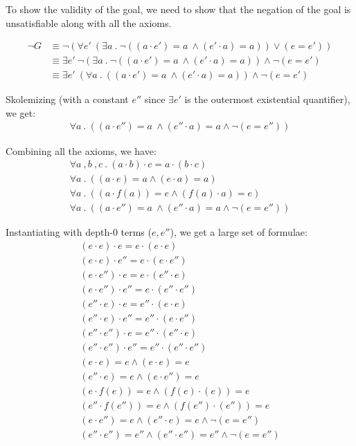 \documentclass[12pt,letterpaper, onecolumn]{exam}
\begin{document}
\begin{questions}
	To show the validity of the goal, we need to show that the negation of the goal is unsatisfiable along with all the axioms.

	\begin{align*}
		\neg G &\equiv \neg (\forall e' \: (\exists a \:.\: \neg((a \cdot e') = a \: \land (e' \cdot a) = a)) \lor (e = e')) \\
		&\equiv \exists e' \: \neg (\exists a \:.\: \neg((a \cdot e') = a \: \land (e' \cdot a) = a)) \land \neg (e = e') \\
		&\equiv \exists e' \: (\forall a \:.\: ((a \cdot e') = a \: \land (e' \cdot a) = a)) \land \neg (e = e')
	\end{align*}

	Skolemizing (with a constant $ e'' $ since $\exists e'$ is the outermost existential quantifier), we get:
	\begin{align*}
		\forall a \:.\: ((a \cdot e'') = a \: \land (e'' \cdot a) = a \land \neg (e = e''))
	\end{align*}

	Combining all the axioms, we have:
	\begin{align*}
		\forall a \:, b \:, c \:.\: (a \cdot b) \cdot c = a \cdot (b \cdot c) \\
		\forall a \:.\: ((a \cdot e) = a \land (e \cdot a) = a) \\
		\forall a \:.\: ((a \cdot f(a)) = e \land (f(a) \cdot a) = e) \\
		\forall a \:.\: ((a \cdot e'') = a \: \land (e'' \cdot a) = a \land \neg (e = e''))
	\end{align*}

	Instantiating with depth-0 terms ($e, e''$), we get a large set of formulae:
	\begin{align*}
		(e \cdot e) \cdot e = e \cdot (e \cdot e) \\
		(e \cdot e) \cdot e'' = e \cdot (e \cdot e'') \\
		(e \cdot e'') \cdot e = e \cdot (e'' \cdot e) \\
		(e \cdot e'') \cdot e'' = e \cdot (e'' \cdot e'') \\
		(e'' \cdot e) \cdot e = e'' \cdot (e \cdot e) \\
		(e'' \cdot e) \cdot e'' = e'' \cdot (e \cdot e'') \\
		(e'' \cdot e'') \cdot e = e'' \cdot (e'' \cdot e) \\
		(e'' \cdot e'') \cdot e'' = e'' \cdot (e'' \cdot e'') \\
		(e \cdot e) = e \land (e \cdot e) = e \\
		(e'' \cdot e) = e \land (e \cdot e'') = e \\
		(e \cdot f(e)) = e \land (f(e) \cdot (e)) = e \\
		(e'' \cdot f(e'')) = e \land (f(e'') \cdot (e'')) = e \\
		(e \cdot e'') = e \land (e'' \cdot e) = e \land \neg (e = e'') \\
		(e'' \cdot e'') = e'' \land (e'' \cdot e'') = e'' \land \neg (e = e'')
	\end{align*}
	

\end{questions}
\end{document}
